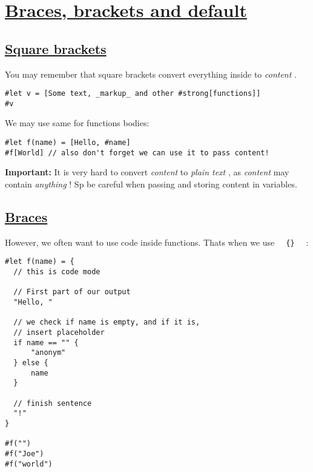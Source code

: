 \section{\texorpdfstring{\hyperref[braces-brackets-and-default]{Braces,
brackets and
default}}{Braces, brackets and default}}\label{braces-brackets-and-default}

\subsection{\texorpdfstring{\hyperref[square-brackets]{Square
brackets}}{Square brackets}}\label{square-brackets}

You may remember that square brackets convert everything inside to
\emph{content} .

\begin{verbatim}
#let v = [Some text, _markup_ and other #strong[functions]]
#v
\end{verbatim}

\pandocbounded{}

We may use same for functions bodies:

\begin{verbatim}
#let f(name) = [Hello, #name]
#f[World] // also don't forget we can use it to pass content!
\end{verbatim}

\pandocbounded{}

\textbf{Important:} It is very hard to convert \emph{content} to
\emph{plain text} , as \emph{content} may contain \emph{anything} ! Sp
be careful when passing and storing content in variables.

\subsection{\texorpdfstring{\hyperref[braces]{Braces}}{Braces}}\label{braces}

However, we often want to use code inside functions.
That\textquotesingle s when we use
\texttt{\ }{\texttt{\ \{\}\ }}\texttt{\ } :

\begin{verbatim}
#let f(name) = {
  // this is code mode

  // First part of our output
  "Hello, "

  // we check if name is empty, and if it is,
  // insert placeholder
  if name == "" {
      "anonym"
  } else {
      name
  }

  // finish sentence
  "!"
}

#f("")
#f("Joe")
#f("world")
\end{verbatim}

